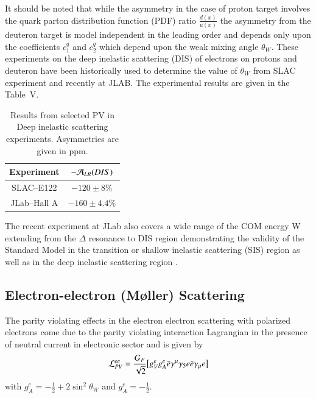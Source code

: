It should be noted that while the asymmetry in the case of proton target involves the quark  parton distribution function (PDF) ratio $\frac{d(x)}{u(x)}$ the asymmetry from the deuteron target is  model independent in the leading order and depends only upon the coefficients $c_1^q$ and $c_2^q$ which depend upon the weak mixing angle $\theta_W$. These experiments on the deep inelastic scattering (DIS) of electrons on protons and deuteron have been historically used to determine the value of $\theta_W$ from SLAC experiment and recently at JLAB. The experimental results are given in the Table~V. 
\begin{table}
\centering
\renewcommand{\arraystretch}{1.2}
\begin{tabular}{|c|c|} 
\hline
Experiment & $-{\cal A}_{LR}(DIS)$ \\ 
\hline
SLAC--E122&$-120\pm8\%$\\
\hline
JLab--Hall A&$-160\pm 4.4\%$ \\
\hline
\end{tabular}
\caption{Results from selected PV in Deep inelastic scattering experiments. Asymmetries are given in ppm.}\label{chap9-tab5}
\end{table}


The recent experiment at JLab also covers a wide range of the COM energy W extending from the $\Delta$ resonance to DIS region demonstrating the validity of the Standard Model in the transition or shallow inelastic scattering (SIS) region as well as in the deep inelastic scattering region \cite{chap9-key28}.
    
\subsection{Electron-electron (M\o ller) Scattering}\label{chap9-subsec3.4}

The parity violating effects in the electron electron scattering with polarized electrons come due to the parity violating interaction Lagrangian in the presence of neutral current in electronic sector and is given by 
\begin{equation}
{\cal L}_{PV}^{ee}= \frac{G_F}{\sqrt{2}}\big[g_V^eg_A^e  \bar{e} \gamma^\mu \gamma_5 e\bar{e}\gamma_\mu e\big] \label{chap9-eq35}
\end{equation}
 with $g_A^e =-\frac{1}{2}+2\sin^2\theta_W$ and $g_A^e=-\frac{1}{2}$.
 
